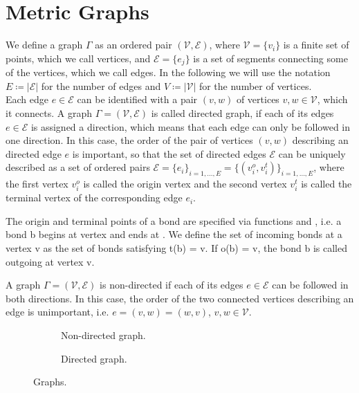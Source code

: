 \section{Metric Graphs}

We define a graph $\Gamma$ as an ordered pair $(\mathcal{V}, \mathcal{E})$, where $\mathcal{V} = \{v_i\}$ is a finite set of points, which we call vertices, and $\mathcal{E} = \{e_j\}$ is a set of segments connecting some of the vertices, which we call edges. In the following we will use the notation $E \coloneqq \left\lvert \mathcal{E} \right\rvert$ for the number of edges and $V \coloneqq \left\lvert \mathcal{V} \right\rvert$ for the number of vertices. \\
Each edge $e \in \mathcal{E}$ can be identified with a pair $(v, w)$ of vertices $v, w \in \mathcal{V}$, which it connects. A graph $\Gamma = (\mathcal{V}, \mathcal{E})$ is called directed graph, if each of its edges $e \in \mathcal{E}$ is assigned a direction, which means that each edge can only be followed in one direction. In this case, the order of the pair of vertices $(v, w)$ describing an directed edge $e$ is important, so that the set of directed edges $\mathcal{E}$ can be uniquely described as a set of ordered pairs $\mathcal{E} = \{e_i\}_{i = 1, \ldots, E} = \{(v^{o}_{i}, v^{t}_{i})\}_{i = 1, \ldots, E}$, where the first vertex $v^{o}_{i}$ is called the origin vertex and the second vertex $v^{t}_{i}$ is called the terminal vertex of the corresponding edge $e_i$. 

The origin and terminal points of a bond are specified via functions  and , i.e. a bond b begins at vertex  and ends at . We define the set of incoming bonds at a vertex v as the set of bonds satisfying t(b) = v. If o(b) = v, the bond b is called outgoing at vertex v.

A graph $\Gamma = (\mathcal{V}, \mathcal{E})$ is non-directed if each of its edges $e \in \mathcal{E}$ can be followed in both directions. In this case, the order of the two connected vertices describing an edge is unimportant, i.e. $e = (v, w) = (w, v)$, $v, w \in \mathcal{V}$. \\

\begin{figure}[H]
    \begin{subfigure}[b]{0.4\textwidth}
        \caption{Non-directed graph.}
        \label{fig:f1}
    \end{subfigure}
    \hfill
    \begin{subfigure}[b]{0.4\textwidth}
        \caption{Directed graph.}
        \label{fig:f2}
    \end{subfigure}
    \caption{Graphs.}
\end{figure}

